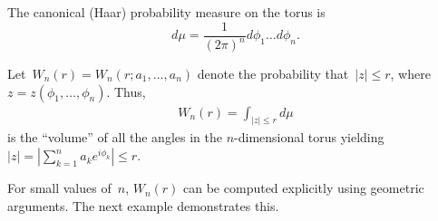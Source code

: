 \documentclass[final ]{IEEEtran}
\newcommand {\T}{\mathbb T^n}
\begin{document}
The canonical (Haar)  probability measure on the torus is
\begin{equation}\label{haar}
d\mu=\frac1{(2\pi)^n} d\phi_1\dots d\phi_n.
\end{equation}

Let~$W_n(r)=W_n(r;a_1,\dots,a_n)$ denote the probability 
that~$|z|\leq r$, where $z=z(\phi_1,\dots,\phi_n)$. Thus,
\begin{align}\label{eq:W_n(r)}   W_n(r) =
\int_{ |z|\leq r }d\mu
\end{align}
is the ``volume'' of all the angles in the $n$-dimensional
 torus
yielding~$|z|=|\sum _{k=1}^n a_ke^{i\phi_k}|\leq r$.


For small values of~$n$, $W_n(r)$ can be computed explicitly using geometric arguments. 
The next example demonstrates this. 
\end{document}
